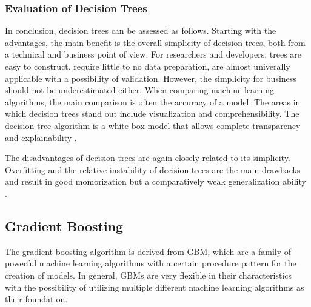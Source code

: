 %

\subsubsection{Evaluation of Decision Trees}

In conclusion, decision trees can be assessed as follows. Starting with the advantages,
the main benefit is the overall simplicity of decision trees, both from a technical and 
business point of view. For researchers and developers, trees are easy to construct, require little
to no data preparation, are almost univerally applicable with a possibility of validation. 
However, the simplicity for business should not be underestimated either. When comparing machine
learning algorithms, the main comparison is often the accuracy of a model. The areas in which 
decision trees stand out include visualization and comprehensibility. The decision tree algorithm 
is a white box model that allows complete transparency and explainability \cite[p.339]{James2021} \cite[10.10.]{sklearn Decision Trees}. 

The disadvantages of decision trees are again closely related to its simplicity. Overfitting and 
the relative instability of decision trees are the main drawbacks and result in good momorization 
but a comparatively weak generalization ability \cite[p.339]{James2021} \cite[10.10.]{sklearn Decision Trees}.

\subsection{Gradient Boosting}
\label{sec:Gradient Boosting}


The gradient boosting algorithm is derived from \ac{GBM}, which are a family of 
powerful machine learning algorithms with a certain procedure pattern for the creation of models. 
In general, \ac{GBM}s are very flexible in their characteristics with the possibility of utilizing 
multiple different machine learning algorithms as their foundation.

